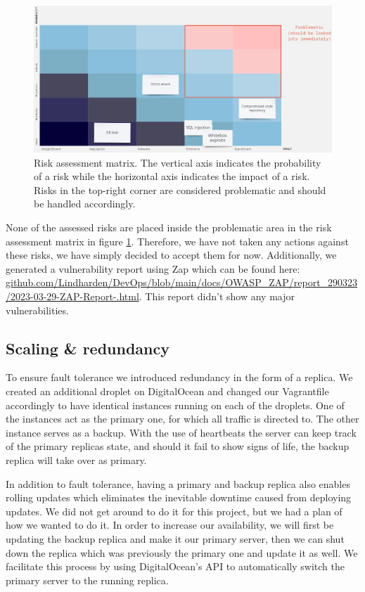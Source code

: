 \begin{figure}[H]
    \centering
    \includegraphics[width=\textwidth]{images/risk_matrix.png}
    \caption{Risk assessment matrix. The vertical axis indicates the probability of a risk while the horizontal axis indicates the impact of a risk. Risks in the top-right corner are considered problematic and should be handled accordingly.}
    \label{fig:risk_matrix}
\end{figure}

None of the assessed risks are placed inside the problematic area in the risk assessment matrix in figure \ref{fig:risk_matrix}. Therefore, we have not taken any actions against these risks, we have simply decided to accept them for now. Additionally, we generated a vulnerability report using Zap which can be found here: \href{https://htmlpreview.github.io/?https://github.com/Lindharden/DevOps/blob/main/docs/OWASP_ZAP/report_290323/2023-03-29-ZAP-Report-.html}{github.com/Lindharden/DevOps/blob/main/docs/OWASP\_ZAP/report\_290323/2023-03-29-ZAP-Report-.html}. This report didn't show any major vulnerabilities.

\subsection{Scaling \& redundancy} \label{sec:scaling}
To ensure fault tolerance we introduced redundancy in the form of a replica. We created an additional droplet on DigitalOcean and changed our Vagrantfile accordingly to have identical instances running on each of the droplets. One of the instances act as the primary one, for which all traffic is directed to. The other instance serves as a backup. With the use of heartbeats the server can keep track of the primary replicas state, and should it fail to show signs of life, the backup replica will take over as primary.

In addition to fault tolerance, having a primary and backup replica also enables rolling updates which eliminates the inevitable downtime caused from deploying updates. We did not get around to do it for this project, but we had a plan of how we wanted to do it. In order to increase our availability, we will first be updating the backup replica and make it our primary server, then we can shut down the replica which was previously the primary one and update it as well. We facilitate this process by using DigitalOcean's API to automatically switch the primary server to the running replica.